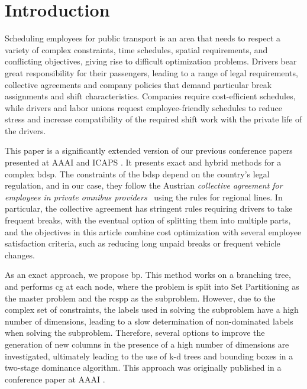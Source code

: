 \documentclass[]{amsart}
\theoremstyle{plain}
\begin{document}
\section{Introduction}
\label{sec:Introduction}

Scheduling employees for public transport is an area that needs to respect a variety of complex constraints, time schedules, spatial requirements, and conflicting objectives, giving rise to difficult optimization problems. Drivers bear great responsibility for their passengers, leading to a range of legal requirements, collective agreements and company policies that demand particular break assignments and shift characteristics. Companies require cost-efficient schedules, while drivers and labor unions request employee-friendly schedules to reduce stress and increase compatibility of the required shift work with the private life of the drivers.

This paper is a significantly extended version of our previous conference papers presented at AAAI \cite{kletzander2021branch} and ICAPS \cite{mazzoli2024investigating}. It presents exact and hybrid methods for a complex \acrfull{bdsp}. The constraints of the \gls{bdsp} depend on the country's legal regulation, and in our case, they follow the Austrian \textit{collective agreement for employees in private omnibus providers}~\cite{WKO} using the rules for regional lines. In particular, the collective agreement has stringent rules requiring drivers to take frequent breaks, with the eventual option of splitting them into multiple parts, and the objectives in this article combine cost optimization with several employee satisfaction criteria, such as reducing long unpaid breaks or frequent vehicle changes.

As an exact approach, we propose \acrfull{bp}. This method works on a branching tree, and performs \acrfull{cg} at each node, where the problem is split into Set Partitioning as the master problem and the \acrfull{rcspp} as the subproblem. However, due to the complex set of constraints, the labels used in solving the subproblem have a high number of dimensions, leading to a slow determination of non-dominated labels when solving the subproblem. Therefore, several options to improve the generation of new columns in the presence of a high number of dimensions are investigated, ultimately leading to the use of k-d trees and bounding boxes in a two-stage dominance algorithm. This approach was originally published in a conference paper at AAAI \cite{kletzander2021branch}.
\end{document}
